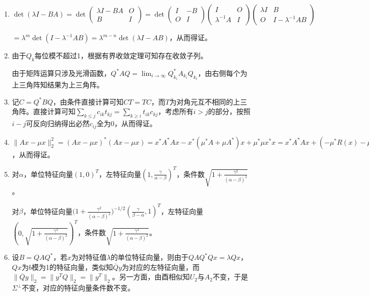 \documentclass[a4paper,UTF8,fontset=windows]{ctexart}
\begin{document}
\begin{enumerate}
\item
$\det(\lambda I-BA)=\det\begin{pmatrix}\lambda I-BA&O\\B&I\end{pmatrix}=\det\begin{pmatrix}I&-B\\O&I\end{pmatrix}\begin{pmatrix}I&O\\\lambda^{-1}A&I\end{pmatrix}\begin{pmatrix}\lambda I&B\\O&I-\lambda^{-1}AB\end{pmatrix}$

$=\lambda^m\det(I-\lambda^{-1}AB)=\lambda^{m-n}\det(\lambda I-AB)$，从而得证。

\item
由于$Q_k$每位模不超过1，根据有界收敛定理可知存在收敛子列。

由于矩阵运算只涉及光滑函数，$Q^*AQ=\lim_{i\to\infty}Q_{k_i}^*A_{k_i}Q_{k_i}$，由右侧每个为上三角阵知结果为上三角阵。

\item
记$C=Q^*BQ$，由条件直接计算可知$CT=TC$，而$T$为对角元互不相同的上三角阵。直接计算可知$\sum_{k\le j}c_{ik}t_{kj}=\sum_{k\ge i}t_{ik}c_{kj}$，考虑所有$i>j$的部分，按照$i-j$可反向归纳得出必然$c_{ij}$全为0，从而得证。

\item
$\|Ax-\mu x\|_2^2=(Ax-\mu x)^*(Ax-\mu x)=x^*A^*Ax-x^*(\mu^* A+\mu A^*)x+\mu^*\mu x^*x=x^*A^*Ax+(-\mu^*R(x)-\mu R(x)^*+\mu^*\mu)x^*x=x^*A^*Ax-R(x)^*R(x)x^*x+\|\mu-R(x)\|_2^2x^*x$，从而得证。

\item
对$\alpha$，单位特征向量$(1,0)^T$，左特征向量$(1,\frac{\gamma}{\alpha-\beta})^T$，条件数$\sqrt{1+\frac{\gamma^2}{(\alpha-\beta)^2}}$。

对$\beta$，单位特征向量$\big(1+\frac{\gamma^2}{(\alpha-\beta)^2}\big)^{-1/2}(\frac{\gamma}{\beta-\alpha},1)^T$，左特征向量$(0,\sqrt{1+\frac{\gamma^2}{(\alpha-\beta)^2}})^T$，条件数$\sqrt{1+\frac{\gamma^2}{(\alpha-\beta)^2}}$。

\item
设$B=QAQ^*$，若$x$为对特征值$\lambda$的单位特征向量，则由于$QAQ^*Qx=\lambda Qx$，$Qx$为$b$模为1的特征向量，类似知$\overline{Q}y$为对应的左特征向量，而$\|\overline{Q}y\|_2=\|y^TQ\|_2=\|y^T\|_2$。另一方面，由酉相似知$U_2$与$A_2$不变，于是$\Sigma^{\bot}$不变，对应的特征向量条件数不变。


\end{enumerate}
\end{document}
